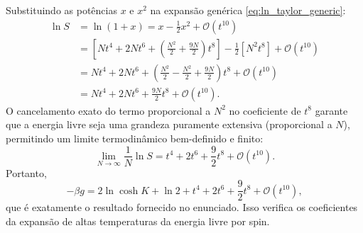 \documentclass[11pt,a4paper]{article}
\begin{document}
%
Substituindo as potências $x$ e $x^2$ na expansão genérica \eqref{eq:ln_taylor_generic}:
%
\begin{align}
    \ln S &= \ln(1 + x) = x - \frac{1}{2}x^2 + \mathcal{O}(t^{10}) \nonumber\\[6pt]
          &= \left[ N t^4 + 2N t^6 + \left(\frac{N^2}{2} + \frac{9N}{2}\right) t^8 \right] - \frac{1}{2} \left[ N^2 t^8 \right] + \mathcal{O}(t^{10}) \nonumber\\[6pt]
          &= N t^4 + 2N t^6 + \left( \frac{N^2}{2} - \frac{N^2}{2} + \frac{9N}{2} \right) t^8 + \mathcal{O}(t^{10}) \nonumber\\[6pt]
          &= N t^4 + 2N t^6 + \frac{9N}{2} t^8 + \mathcal{O}(t^{10}).
\end{align}
%
O cancelamento exato do termo proporcional a $N^2$ no coeficiente de $t^8$ garante que a energia livre seja uma grandeza puramente extensiva (proporcional a $N$), permitindo um limite termodinâmico bem-definido e finito:
%
\begin{equation}
    \lim_{N\to\infty} \frac{1}{N} \ln S = t^4 + 2 t^6 + \frac{9}{2} t^8 + \mathcal{O}(t^{10}).
\end{equation}
%
Portanto,
%
\begin{equation}
    \boxed{
    -\beta g
    = 2 \ln \cosh K + \ln 2
    + t^4 + 2 t^6 + \frac{9}{2} t^8 + \mathcal O(t^{10}),
    }
    \label{eq:free_energy_expansion}
\end{equation}
%
que é exatamente o resultado fornecido no enunciado. Isso verifica os coeficientes da expansão de altas temperaturas da energia livre por spin.
\end{document}
